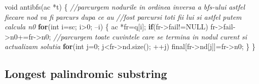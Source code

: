 \documentclass[10pt,]{article}
\newenvironment{Shaded}{}{}
\newcommand{\KeywordTok}[1]{\textcolor[rgb]{0.00,0.44,0.13}{\textbf{{#1}}}}
\newcommand{\DataTypeTok}[1]{\textcolor[rgb]{0.56,0.13,0.00}{{#1}}}
\newcommand{\DecValTok}[1]{\textcolor[rgb]{0.25,0.63,0.44}{{#1}}}
\newcommand{\CommentTok}[1]{\textcolor[rgb]{0.38,0.63,0.69}{\textit{{#1}}}}
\newcommand{\NormalTok}[1]{{#1}}
\begin{document}
\begin{Shaded}
\begin{Highlighting}[]
\DataTypeTok{void} \NormalTok{antibfs(ac *t) \{}
    \CommentTok{//parcurgem nodurile in ordinea inversa a bfs-ului astfel fiecare nod va fi parcurs dupa ce au}
    \CommentTok{//fost parcursi toti fii lui si astfel putem calcula n0}
    \KeywordTok{for}\NormalTok{(}\DataTypeTok{int} \NormalTok{i=sc; i>}\DecValTok{0}\NormalTok{; --i) \{}
        \NormalTok{ac *fr=q[i];}
        \KeywordTok{if}\NormalTok{(fr->fail!=NULL) fr->fail->n0+=fr->n0;}
        \CommentTok{//parcurgem toate cuvintele care se termina in nodul curent si actualizam solutia}
        \KeywordTok{for}\NormalTok{(}\DataTypeTok{int} \NormalTok{j=}\DecValTok{0}\NormalTok{; j<fr->nd.size(); ++j) final[fr->nd[j]]=fr->n0;}
    \NormalTok{\}}
\NormalTok{\}}
\end{Highlighting}
\end{Shaded}

\subsection{Longest palindromic substring}
\end{document}
